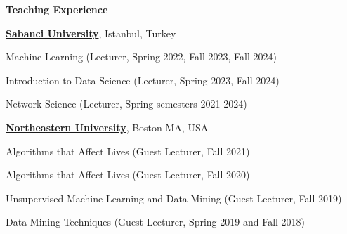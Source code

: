 \documentclass[10pt]{article}
\newenvironment{innerlist}[1][\enskip\textbullet]%
        {\begin{compactitem}[#1]}{\end{compactitem}}
\begin{document}

\textbf{Teaching Experience}
%
\begin{innerlist}
\item[] \href{https://www.sabanciuniv.edu/}{\textbf{Sabanci University}},
Istanbul, Turkey
\begin{innerlist}
\item[] Machine Learning (Lecturer, Spring 2022, Fall 2023, Fall 2024)
\item[] Introduction to Data Science (Lecturer, Spring 2023, Fall 2024)
\item[] Network Science (Lecturer, Spring semesters 2021-2024)
\end{innerlist}
\end{innerlist}

\begin{innerlist}
\item[] \href{https://www.northeastern.edu/}{\textbf{Northeastern University}},
Boston MA, USA
\begin{innerlist}
\item[] Algorithms that Affect Lives (Guest Lecturer, Fall 2021)
\item[] Algorithms that Affect Lives (Guest Lecturer, Fall 2020)
\item[] Unsupervised Machine Learning and Data Mining (Guest Lecturer, Fall 2019)
\item[] Data Mining Techniques (Guest Lecturer, Spring 2019 and Fall 2018)
\end{innerlist}
\end{innerlist}
\end{document}
